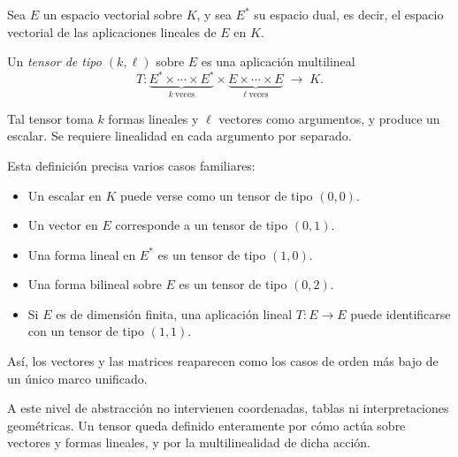 \medskip

Sea \(E\) un espacio vectorial sobre \(K\), y sea \(E^*\) su espacio dual,
es decir, el espacio vectorial de las aplicaciones lineales de \(E\) en \(K\).

\begin{definition}
Un \emph{tensor de tipo \((k,\ell)\)} sobre \(E\) es una aplicación multilineal
\[
T : \underbrace{E^* \times \cdots \times E^*}_{k\ \text{veces}}
\times
\underbrace{E \times \cdots \times E}_{\ell\ \text{veces}}
\;\longrightarrow\; K.
\]
\end{definition}

Tal tensor toma \(k\) formas lineales y \(\ell\) vectores como argumentos,
y produce un escalar.
Se requiere linealidad en cada argumento por separado.

\medskip

Esta definición precisa varios casos familiares:
\begin{itemize}
\item Un escalar en \(K\) puede verse como un tensor de tipo \((0,0)\).
\item Un vector en \(E\) corresponde a un tensor de tipo \((0,1)\).
\item Una forma lineal en \(E^*\) es un tensor de tipo \((1,0)\).
\item Una forma bilineal sobre \(E\) es un tensor de tipo \((0,2)\).
\item Si $E$ es de dimensión finita, una aplicación lineal $T : E \to E$ puede
      identificarse con un tensor de tipo $(1,1)$.
\end{itemize}

Así, los vectores y las matrices reaparecen como los casos de orden más bajo
de un único marco unificado.

\medskip

A este nivel de abstracción no intervienen coordenadas, tablas ni
interpretaciones geométricas.
Un tensor queda definido enteramente por cómo actúa sobre vectores y formas
lineales, y por la multilinealidad de dicha acción.


